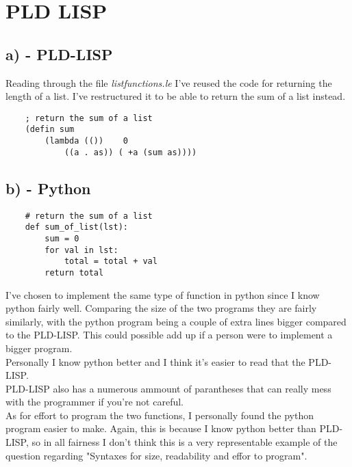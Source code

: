 \section{PLD LISP}
\subsection{a) - PLD-LISP}
Reading through the file \emph{listfunctions.le} I've reused the code
for returning the length of a list. I've restructured it to be able
to return the sum of a list instead.

\begin{verbatim}
    ; return the sum of a list
    (defin sum
        (lambda (())    0
            ((a . as)) ( +a (sum as))))
\end{verbatim}

\subsection{b) - Python}
\begin{verbatim}
    # return the sum of a list
    def sum_of_list(lst):
        sum = 0
        for val in lst:
            total = total + val
        return total
\end{verbatim}

I've chosen to implement the same type of function in python since I know
python fairly well.
Comparing the size of the two programs they are fairly similarly, with the python
program being a couple of extra lines bigger compared to the PLD-LISP. This could
possible add up if a person were to implement a bigger program.
\\
Personally I know python better and I think it's easier to read that the PLD-LISP.
\\
PLD-LISP also has a numerous ammount of parantheses that can really mess with the 
programmer if you're not careful.
\\
As for effort to program the two functions, I personally found the python program
easier to make. Again, this is because I know python better than PLD-LISP, so in all
fairness I don't think this is a very representable example of the question regarding
"Syntaxes for size, readability and effor to program".
